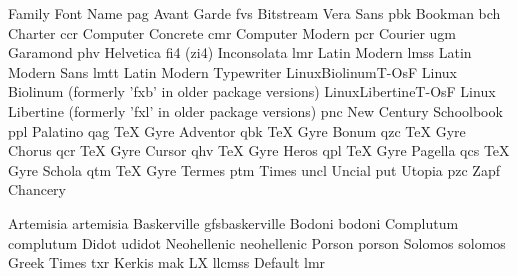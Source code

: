 Family                 Font Name
pag                    Avant Garde
fvs                    Bitstream Vera Sans
pbk                    Bookman
bch                    Charter
ccr                    Computer Concrete
cmr                    Computer Modern
pcr                    Courier
ugm                    Garamond
phv                    Helvetica
fi4 (zi4)              Inconsolata
lmr                    Latin Modern
lmss                   Latin Modern Sans
lmtt                   Latin Modern Typewriter
LinuxBiolinumT-OsF     Linux Biolinum (formerly 'fxb' in older package versions)
LinuxLibertineT-OsF    Linux Libertine (formerly 'fxl' in older package versions)
pnc                    New Century Schoolbook
ppl                    Palatino
qag                    TeX Gyre Adventor 
qbk                    TeX Gyre Bonum 
qzc                    TeX Gyre Chorus
qcr                    TeX Gyre Cursor
qhv                    TeX Gyre Heros
qpl                    TeX Gyre Pagella 
qcs                    TeX Gyre Schola
qtm                    TeX Gyre Termes
ptm                    Times
uncl                   Uncial
put                    Utopia
pzc                    Zapf Chancery


Artemisia              artemisia 
Baskerville            gfsbaskerville 
Bodoni                 bodoni 
Complutum              complutum 
Didot                  udidot 
Neohellenic            neohellenic 
Porson                 porson 
Solomos                solomos 
Greek Times            txr 
Kerkis                 mak 
LX                     llcmss 
Default                lmr